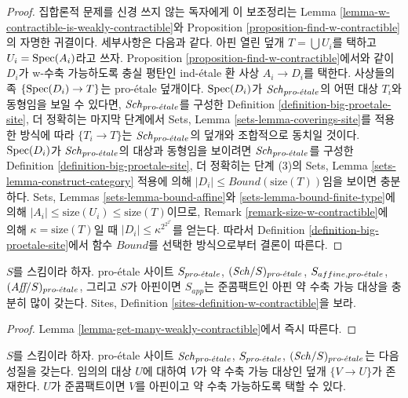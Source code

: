 \begin{proof}
집합론적 문제를 신경 쓰지 않는 독자에게 이 보조정리는 Lemma
\ref{lemma-w-contractible-is-weakly-contractible}와 Proposition
\ref{proposition-find-w-contractible}의 자명한 귀결이다.
세부사항은 다음과 같다. 아핀 열린 덮개 $T = \bigcup U_i$를 택하고
$U_i = \mathop{\mathrm{Spec}}(A_i)$라고 쓰자. Proposition
\ref{proposition-find-w-contractible}에서와 같이 $D_i$가 w-수축
가능하도록 충실 평탄인 ind-\'etale 환 사상 $A_i \to D_i$를 택한다.
사상들의 족 $\{\mathop{\mathrm{Spec}}(D_i) \to T\}$는 pro-\'etale 덮개이다.
$\mathop{\mathrm{Spec}}(D_i)$가 $\mathit{Sch}_{pro\text{-}\acute{e}tale}$의 어떤 대상 $T_i$와 동형임을 보일 수
있다면, $\mathit{Sch}_{pro\text{-}\acute{e}tale}$를 구성한 Definition
\ref{definition-big-proetale-site}, 더 정확히는 마지막 단계에서 Sets,
Lemma \ref{sets-lemma-coverings-site}를 적용한 방식에 따라
$\{T_i \to T\}$는 $\mathit{Sch}_{pro\text{-}\acute{e}tale}$의 덮개와 조합적으로 동치일 것이다.
$\mathop{\mathrm{Spec}}(D_i)$가 $\mathit{Sch}_{pro\text{-}\acute{e}tale}$의 대상과 동형임을 보이려면
$\mathit{Sch}_{pro\text{-}\acute{e}tale}$를 구성한 Definition
\ref{definition-big-proetale-site}, 더 정확히는 단계 (3)의 Sets, Lemma
\ref{sets-lemma-construct-category} 적용에 의해
$|D_i| \leq Bound(\text{size}(T))$임을 보이면 충분하다.
Sets, Lemmas \ref{sets-lemma-bound-affine}와
\ref{sets-lemma-bound-finite-type}에 의해
$|A_i| \leq \text{size}(U_i) \leq \text{size}(T)$이므로, Remark
\ref{remark-size-w-contractible}에 의해 $\kappa = \text{size}(T)$일 때
$|D_i| \leq \kappa^{2^{2^{2^\kappa}}}$를 얻는다. 따라서 Definition
\ref{definition-big-proetale-site}에서 함수 $Bound$를 선택한 방식으로부터
결론이 따른다.
\end{proof}

\begin{lemma}
\label{lemma-proetale-enough-w-contractible}
$S$를 스킴이라 하자. pro-\'etale 사이트
$S_{pro\text{-}\acute{e}tale}$, $(\mathit{Sch}/S)_{pro\text{-}\acute{e}tale}$, $S_{affine, {pro\text{-}\acute{e}tale}}$,
$(\textit{Aff}/S)_{pro\text{-}\acute{e}tale}$, 그리고 $S$가 아핀이면 $S_{app}$는
준콤팩트인 아핀 약 수축 가능 대상을 충분히 많이 갖는다.
Sites, Definition \ref{sites-definition-w-contractible}을 보라.
\end{lemma}

\begin{proof}
Lemma \ref{lemma-get-many-weakly-contractible}에서 즉시 따른다.
\end{proof}

\begin{lemma}
\label{lemma-weakly-contractible-cover}
$S$를 스킴이라 하자. pro-\'etale 사이트
$\mathit{Sch}_{pro\text{-}\acute{e}tale}$, $S_{pro\text{-}\acute{e}tale}$, $(\mathit{Sch}/S)_{pro\text{-}\acute{e}tale}$는 다음 성질을
갖는다. 임의의 대상 $U$에 대하여 $V$가 약 수축 가능 대상인 덮개
$\{V \to U\}$가 존재한다. $U$가 준콤팩트이면 $V$를 아핀이고 약 수축
가능하도록 택할 수 있다.
\end{lemma}

